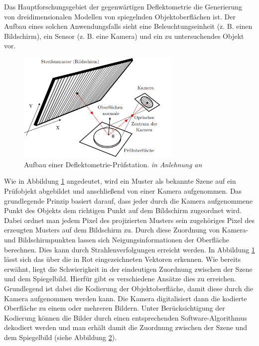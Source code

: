 Das Hauptforschungsgebiet der gegenwärtigen Deflektometrie die Generierung von dreidimensionalen Modellen von spiegelnden Objektoberflächen ist.
Der Aufbau eines solchen Anwendungsfalls sieht eine Beleuchtungseinheit (z. B. einen Bildschirm), ein Sensor (z. B. eine Kamera) und ein zu untersuchendes Objekt vor.

\begin{figure}[H]
	\centering
	\includegraphics[width=0.7\textwidth]{02_grundlagenZurDeflektometrie/rekonstruktion/figures/nature-articel-nr1}
	\caption[Aufbau einer Deflektometrie-Prüfstation]{Aufbau einer Deflektometrie-Prüfstation. \textit{in Anlehnung an} \cite{aufbau}}
	\label{img:aufbau}
\end{figure}

\noindent
Wie in Abbildung \ref{img:aufbau} angedeutet, wird ein Muster als bekannte Szene auf ein Prüfobjekt abgebildet und anschließend von einer Kamera aufgenommen.
Das grundlegende Prinzip basiert darauf, dass jeder durch die Kamera aufgenommene Punkt des Objekts dem richtigen Punkt auf dem Bildschirm zugeordnet wird.
Dabei ordnet man jedem Pixel des projizierten Musters sein zugehöriges Pixel des erzeugten Musters auf dem Bildschirm zu.
Durch diese Zuordnung von Kamera- und Bildschirmpunkten lassen sich Neigungsinformationen der Oberfläche berechnen.
Dies kann durch Strahlenverfolgungen erreicht werden.
In Abbildung \ref{img:aufbau} lässt sich das über die in Rot eingezeichneten Vektoren erkennen.
Wie bereits erwähnt, liegt die Schwierigkeit in der eindeutigen Zuordnung zwischen der Szene und dem Spiegelbild.
Hierfür gibt es verschiedene Ansätze dies zu erreichen.
Grundlegend ist dabei die Kodierung der Objektoberfläche, damit diese durch die Kamera aufgenommen werden kann.
Die Kamera digitalisiert dann die kodierte Oberfläche zu einem oder mehreren Bildern.
Unter Berücksichtigung der Kodierung können die Bilder durch einen entsprechenden Software-Algorithmus dekodiert werden und man erhält damit die Zuordnung zwischen der Szene und dem Spiegelbild (siehe Abbildung \ref{tikz:abbKodierungUndDekodierung}).
%
{
	\begin{figure}[H]
		\centering
		
		\label{tikz:abbKodierungUndDekodierung}
	\end{figure}
}

